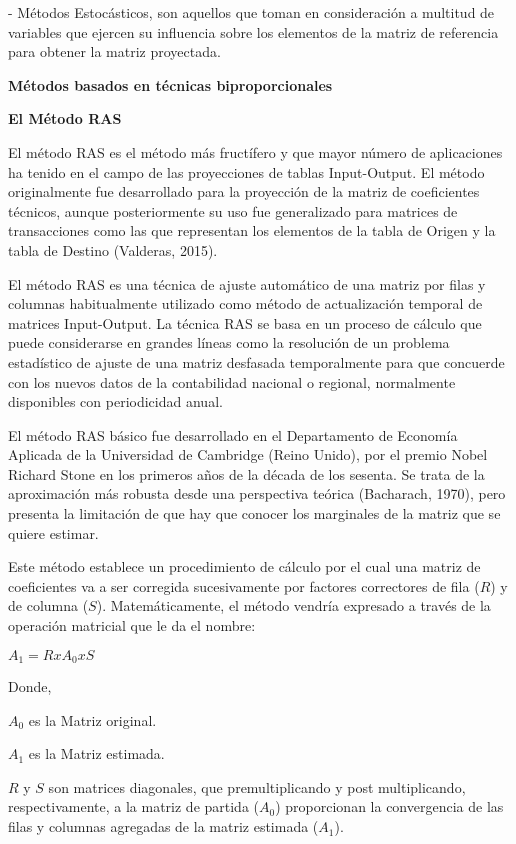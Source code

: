 \documentclass{article}
\begin{document}
- Métodos Estocásticos, son aquellos que toman en consideración a multitud de variables que ejercen su influencia sobre los elementos de la matriz de referencia para obtener la matriz proyectada.


{\bf Métodos basados en técnicas biproporcionales}

{\bf El Método RAS}

El método RAS es el método más fructífero y que mayor número de aplicaciones ha tenido en el campo de las proyecciones de tablas Input-Output. El método originalmente fue desarrollado para la proyección de la matriz de coeficientes técnicos, aunque posteriormente su uso fue generalizado para matrices de transacciones como las que representan los elementos de la tabla de Origen y la tabla de Destino (Valderas, 2015).

El método RAS es una técnica de ajuste automático de una matriz por filas y columnas habitualmente utilizado como método de actualización temporal de matrices Input-Output. La técnica RAS se basa en un proceso de cálculo que puede considerarse en grandes líneas como la resolución de un problema estadístico de ajuste de una matriz desfasada temporalmente para que concuerde con los nuevos datos de la contabilidad nacional o regional, normalmente disponibles con periodicidad anual.

El método RAS básico fue desarrollado en el Departamento de Economía Aplicada de la Universidad de Cambridge (Reino Unido), por el premio Nobel Richard Stone en los primeros años de la década de los sesenta. Se trata de la aproximación más robusta desde una perspectiva teórica (Bacharach, 1970), pero presenta la limitación de que hay que conocer los marginales de la matriz que se quiere estimar.


Este método establece un procedimiento de cálculo por el cual una matriz de coeficientes va a ser corregida sucesivamente por factores correctores de fila ($R$) y de columna ($S$). Matemáticamente, el método vendría expresado a través de la operación matricial que le da el nombre:

$A_1=RxA_0xS$

Donde,

$A_0$ es la Matriz original.

$A_1$ es la  Matriz estimada.

$R$ y $S$ son matrices diagonales, que premultiplicando y post multiplicando, respectivamente, a la matriz de partida ($A_0$) proporcionan la convergencia de las filas y columnas agregadas de la matriz estimada ($A_1$).
\end{document}
